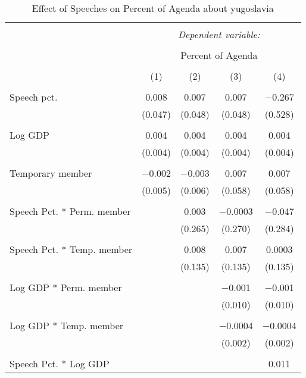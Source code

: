 
\begin{table}[!htbp] \centering 
  \caption{Effect of Speeches on Percent of Agenda about  yugoslavia} 
  \label{} 
\begin{tabular}{@{\extracolsep{5pt}}lcccc} 
\\[-1.8ex]\hline 
\hline \\[-1.8ex] 
 & \multicolumn{4}{c}{\textit{Dependent variable:}} \\ 
\cline{2-5} 
\\[-1.8ex] & \multicolumn{4}{c}{Percent of Agenda} \\ 
\\[-1.8ex] & (1) & (2) & (3) & (4)\\ 
\hline \\[-1.8ex] 
 Speech pct. & 0.008 & 0.007 & 0.007 & $-$0.267 \\ 
  & (0.047) & (0.048) & (0.048) & (0.528) \\ 
  & & & & \\ 
 Log GDP & 0.004 & 0.004 & 0.004 & 0.004 \\ 
  & (0.004) & (0.004) & (0.004) & (0.004) \\ 
  & & & & \\ 
 Temporary member & $-$0.002 & $-$0.003 & 0.007 & 0.007 \\ 
  & (0.005) & (0.006) & (0.058) & (0.058) \\ 
  & & & & \\ 
 Speech Pct. * Perm. member &  & 0.003 & $-$0.0003 & $-$0.047 \\ 
  &  & (0.265) & (0.270) & (0.284) \\ 
  & & & & \\ 
 Speech Pct. * Temp. member &  & 0.008 & 0.007 & 0.0003 \\ 
  &  & (0.135) & (0.135) & (0.135) \\ 
  & & & & \\ 
 Log GDP * Perm. member &  &  & $-$0.001 & $-$0.001 \\ 
  &  &  & (0.010) & (0.010) \\ 
  & & & & \\ 
 Log GDP * Temp. member &  &  & $-$0.0004 & $-$0.0004 \\ 
  &  &  & (0.002) & (0.002) \\ 
  & & & & \\ 
 Speech Pct. * Log GDP &  &  &  & 0.011 \\ 

\end{tabular}
\end{table}
